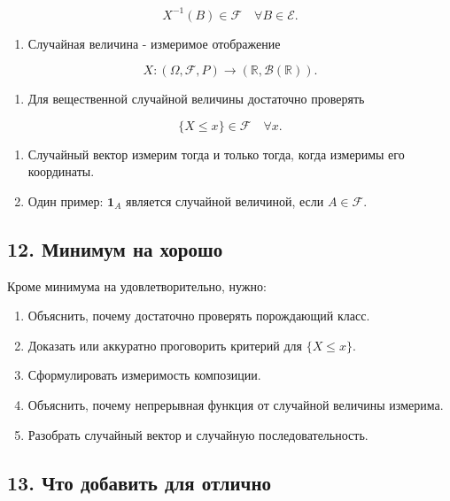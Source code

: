\documentclass[
  11pt,
  a4paper,
]{article}
\providecommand{\tightlist}{%
  \setlength{\itemsep}{0pt}\setlength{\parskip}{0pt}}
\begin{document}
\[
X^{-1}(B)\in\mathcal F\quad \forall B\in\mathcal E.
\]

\begin{enumerate}
\def\labelenumi{\arabic{enumi}.}
\setcounter{enumi}{1}
\tightlist
\item
  Случайная величина - измеримое отображение
\end{enumerate}

\[
X:(\Omega,\mathcal F,P)\to(\mathbb R,\mathcal B(\mathbb R)).
\]

\begin{enumerate}
\def\labelenumi{\arabic{enumi}.}
\setcounter{enumi}{2}
\tightlist
\item
  Для вещественной случайной величины достаточно проверять
\end{enumerate}

\[
\{X\le x\}\in\mathcal F\quad \forall x.
\]

\begin{enumerate}
\def\labelenumi{\arabic{enumi}.}
\setcounter{enumi}{3}
\item
  Случайный вектор измерим тогда и только тогда, когда измеримы его
  координаты.
\item
  Один пример: \(\mathbf 1_A\) является случайной величиной, если
  \(A\in\mathcal F\).
\end{enumerate}

\subsection{12. Минимум на
хорошо}\label{ux43cux438ux43dux438ux43cux443ux43c-ux43dux430-ux445ux43eux440ux43eux448ux43e}

Кроме минимума на удовлетворительно, нужно:

\begin{enumerate}
\def\labelenumi{\arabic{enumi}.}
\tightlist
\item
  Объяснить, почему достаточно проверять порождающий класс.
\item
  Доказать или аккуратно проговорить критерий для \(\{X\le x\}\).
\item
  Сформулировать измеримость композиции.
\item
  Объяснить, почему непрерывная функция от случайной величины измерима.
\item
  Разобрать случайный вектор и случайную последовательность.
\end{enumerate}

\subsection{13. Что добавить для
отлично}\label{ux447ux442ux43e-ux434ux43eux431ux430ux432ux438ux442ux44c-ux434ux43bux44f-ux43eux442ux43bux438ux447ux43dux43e}
\end{document}
